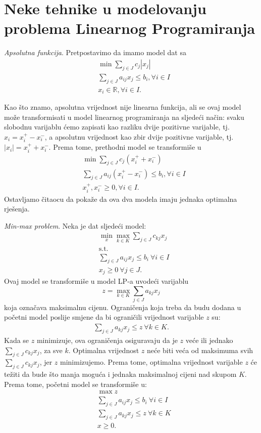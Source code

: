 \documentclass[a4paper, utf8, 11pt, colorlinks]{book}
\begin{document}
\section{Neke tehnike u modelovanju problema Linearnog Programiranja}

\emph{Apsolutna funkcija}.   Pretpostavimo da imamo model dat sa 
\begin{align*}
	&\min \sum_{j \in J} c_j |x_j| \\
	& \sum_{j\in J} a_{ij} x_j \leq b_i, \forall i\in I \\
	& x_i \in \mathbb{R}, \forall i \in I.
\end{align*} 

Kao što znamo, apsolutna vrijednost nije linearna funkcija, ali se ovaj model može transformisati u model linearnog programiranja na sljedeći način: 
svaku slobodnu varijablu ćemo zapisati kao razliku dvije pozitivne varijable, tj.  $x_i = x_i^+ - x_i^-$, a apsolutnu vrijednost kao zbir dvije pozitivne varijable, tj. $|x_i|= x_i^+ + x_i^-$. Prema tome, prethodni model se transformiše  u 
\begin{align*}
	&\min \sum_{j \in J} c_j  (x_i^+ + x_i^-) \\
	&\sum_{j\in J} a_{ij} (  x_i^+ - x_i^- ) \leq b_i, \forall i\in I \\
	&  x_i^+, x_i^- \geq 0, \forall i \in I.
\end{align*}
Ostavljamo čitaocu da pokaže da ova dva modela imaju jednaka optimalna rješenja.

\emph{Min-max problem}. Neka je dat sljedeći model: 
\begin{align*}
	&\min_{x} \max_{k \in K} \sum_{j \in J} c_{kj} x_j \\
	&\mbox{s.t.} \nonumber \\
	& \sum_{j \in J} a_{ij} x_j \leq b_i\  \forall i \in I \\
	& x_j \geq 0\ \forall j \in J.
\end{align*}
Ovaj  model se transformiše u model LP-a uvodeći varijablu $$z=\max_{k \in K} \sum_{j \in J} a_{kj}x_j$$ koja označava maksimalnu cijenu. Ograničenja koja treba da budu dodana u početni model poslije smjene da bi ograničili vrijednost varijable $z$ su:
\begin{eqnarray}
	\sum_{j \in J} a_{kj} x_j \leq z\ \forall k \in K.
\end{eqnarray}
Kada se $z$ minimizuje, ova ograničenja osiguravaju da je $z$ veće ili jednako  $\sum_{j \in J} c_{kj}x_j$, za sve $k$. Optimalna vrijednost $z$ neće biti veća od maksimuma svih $\sum_{j \in J} c_{kj}x_j$, jer  $z$ minimizujemo. Prema tome, optimalna vrijednost varijable $z$ će težiti da bude što manja moguća i jednaka maksimalnoj cijeni nad skupom $K$. Prema tome, početni model se transformiše u:
\begin{align*}
	&\max z \\
	&\sum_{j \in J} a_{ij} x_j \leq b_i\  \forall i \in I \\ 
	& 	 \sum_{j \in J} a_{kj} x_j \leq z\ \forall k \in K \\
	& x \geq 0.
\end{align*}
\end{document}
